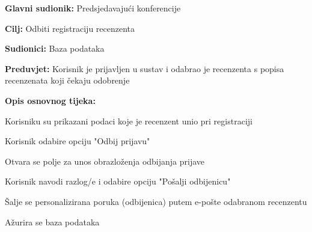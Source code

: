 					
					\noindent {}
					\begin{packed_item}
						
						\item \textbf{Glavni sudionik: } Predsjedavajući konferencije
						\item  \textbf{Cilj:} Odbiti registraciju recenzenta 
						\item  \textbf{Sudionici:} Baza podataka
						\item  \textbf{Preduvjet:} Korisnik je prijavljen u sustav i odabrao je recenzenta s popisa recenzenata koji čekaju odobrenje
						\item  \textbf{Opis osnovnog tijeka:}
						
						\item[] \begin{packed_enum}
							
							
							\item Korisniku su prikazani podaci koje je recenzent unio pri registraciji
							\item Korisnik odabire opciju "Odbij prijavu"
							\item Otvara se polje za unos obrazloženja odbijanja prijave
							\item Korisnik navodi razlog/e i odabire opciju "Pošalji odbijenicu"
							\item Šalje se personalizirana poruka (odbijenica) putem e-pošte odabranom recenzentu
							\item Ažurira se baza podataka
							
							
						\end{packed_enum}
						
					\end{packed_item}
					
